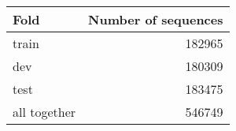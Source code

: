 \begin{tabular}{lr}
\toprule
         Fold &  Number of sequences \\
\midrule
        train &               182965 \\
          dev &               180309 \\
         test &               183475 \\
 all together &               546749 \\
\bottomrule
\end{tabular}
